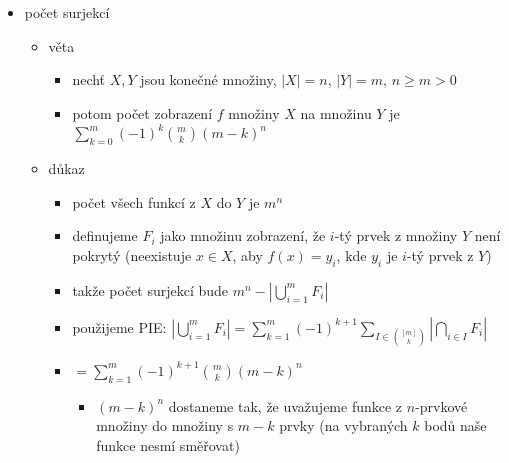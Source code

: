 \begin{itemize}
\begin{itemize}
\begin{itemize}
\begin{itemize}
\item zjevně $\varphi(n)=n-|\bigcup_{i=1}^k A_i|$
\item $|A_i|=\frac n{p_i}$
\item pro různé $i,j\in[k]$ platí $|A_i\cap A_j|=\frac n{p_ip_j}$
\item to se dá zobecnit na průnik více množin
\item dle PIE $|\bigcup_{i=1}^kA_i|=\sum_{I\in 2^{[n]}\setminus\set\emptyset}(-1)^{|I|+1}\frac{n}{\prod_{i\in I} p_i}$
\item $=n(\frac1{p_1}+\dots+\frac1{p_k}-\frac1{p_1p_2}-\dots+\frac1{p_1p_2p_3}+\dots+(-1)^{k+1}\frac1{p_1\dots p_k})$
\item proto $\varphi(n)=n(1-\frac1{p_1}-\dots-\frac1{p_k}+\frac{1}{p_1p_2}+\dots+(-1)^k\frac1{p_1\dots p_k})$
\item tedy $\varphi(n)=n(1-\frac{1}{p_1})(1-\frac1{p_2})\dots(1-\frac1{p_k})\quad\square$
\begin{itemize}
\item z každé závorky vždy vybíráme levý nebo pravý člen
\end{itemize}
\end{itemize}
\end{itemize}
\item počet surjekcí
\begin{itemize}
\item věta
\begin{itemize}
\item nechť $X,Y$ jsou konečné množiny, $|X|=n$, $|Y|=m$, $n\geq m\gt 0$
\item potom počet zobrazení $f$ množiny $X$ na množinu $Y$ je $\sum_{k=0}^m(-1)^k\binom mk(m-k)^n$
\end{itemize}
\item důkaz
\begin{itemize}
\item počet všech funkcí z $X$ do $Y$ je $m^n$
\item definujeme $F_i$ jako množinu zobrazení, že $i$-tý prvek z množiny $Y$ není pokrytý (neexistuje $x\in X$, aby $f(x)=y_i$, kde $y_i$ je $i$-tý prvek z $Y$)
\item takže počet surjekcí bude $m^n-|\bigcup_{i=1}^m F_i|$
\item použijeme PIE: $|\bigcup_{i=1}^mF_i|=\sum_{k=1}^m(-1)^{k+1}\sum_{I\in{[m]\choose k}}|\bigcap_{i\in I}F_i|$
\item $=\sum_{k=1}^m(-1)^{k+1}\binom mk(m-k)^n$
\begin{itemize}
\item $(m-k)^n$ dostaneme tak, že uvažujeme funkce z $n$-prvkové množiny do množiny s $m-k$ prvky (na vybraných $k$ bodů naše funkce nesmí směřovat)

\end{itemize}
\end{itemize}
\end{itemize}
\end{itemize}
\end{itemize}

